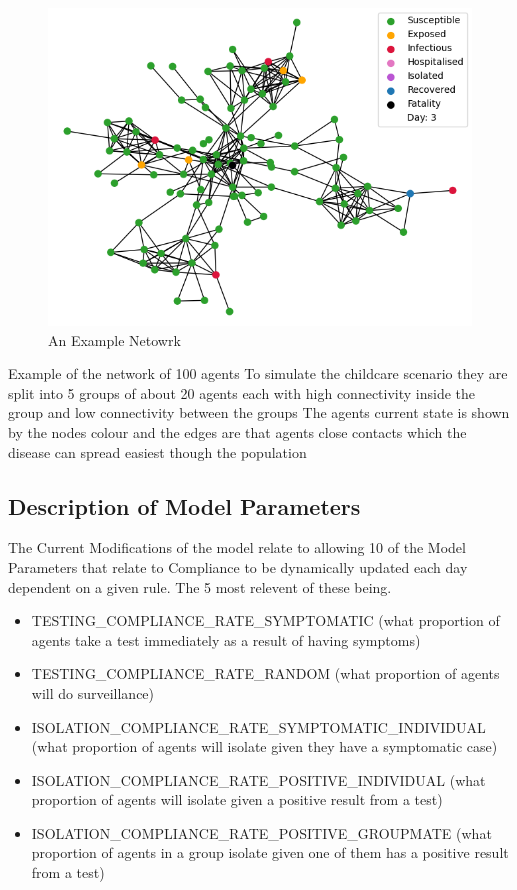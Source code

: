 \documentclass{article}
\begin{document}
\begin{figure}
  \centering
      \includegraphics[width=\textwidth]{network}
  \caption{An Example Netowrk}
\end{figure}

Example of the network of 100 agents
To simulate the childcare scenario they are split into 5 groups of about 20 agents each with high connectivity inside the group and low connectivity between the groups 
The agents current state is shown by the nodes colour and the edges are that agents close contacts which the disease can spread easiest though the population


\subsection{Description of Model Parameters}
The Current Modifications of the model relate to allowing 10 of the Model Parameters that relate to Compliance to be dynamically updated each day dependent on a given rule. The 5 most relevent of these being.
\begin{itemize}
\item TESTING\_COMPLIANCE\_RATE\_SYMPTOMATIC (what proportion of agents take a test immediately as a result of having symptoms)
\item TESTING\_COMPLIANCE\_RATE\_RANDOM  (what proportion of agents will do surveillance)
\item ISOLATION\_COMPLIANCE\_RATE\_SYMPTOMATIC\_INDIVIDUAL (what proportion of agents will isolate given they have a symptomatic case)
\item ISOLATION\_COMPLIANCE\_RATE\_POSITIVE\_INDIVIDUAL (what proportion of agents will isolate given a positive result from a test)
\item ISOLATION\_COMPLIANCE\_RATE\_POSITIVE\_GROUPMATE (what proportion of agents in a group isolate given one of them has a positive result from a test)
\end{itemize}
\end{document}

